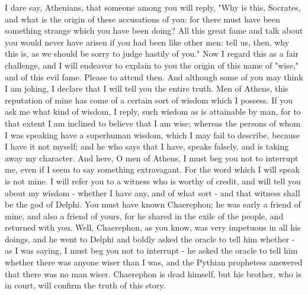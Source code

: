 \documentclass[11pt]{article}
\begin{document}
I dare say, Athenians, that someone among you will reply, "Why is this, Socrates, and what is the origin of these accusations of you: for there must have been something strange which you have been doing? All this great fame and talk about you would never have arisen if you had been like other men: tell us, then, why this is, as we should be sorry to judge hastily of you." Now I regard this as a fair challenge, and I will endeavor to explain to you the origin of this name of "wise," and of this evil fame. Please to attend then. And although some of you may think I am joking, I declare that I will tell you the entire truth. Men of Athens, this reputation of mine has come of a certain sort of wisdom which I possess. If you ask me what kind of wisdom, I reply, such wisdom as is attainable by man, for to that extent I am inclined to believe that I am wise; whereas the persons of whom I was speaking have a superhuman wisdom, which I may fail to describe, because I have it not myself; and he who says that I have, speaks falsely, and is taking away my character. And here, O men of Athens, I must beg you not to interrupt me, even if I seem to say something extravagant. For the word which I will speak is not mine. I will refer you to a witness who is worthy of credit, and will tell you about my wisdom - whether I have any, and of what sort - and that witness shall be the god of Delphi. You must have known Chaerephon; he was early a friend of mine, and also a friend of yours, for he shared in the exile of the people, and returned with you. Well, Chaerephon, as you know, was very impetuous in all his doings, and he went to Delphi and boldly asked the oracle to tell him whether - as I was saying, I must beg you not to interrupt - he asked the oracle to tell him whether there was anyone wiser than I was, and the Pythian prophetess answered that there was no man wiser. Chaerephon is dead himself, but his brother, who is in court, will confirm the truth of this story.
\end{document}
